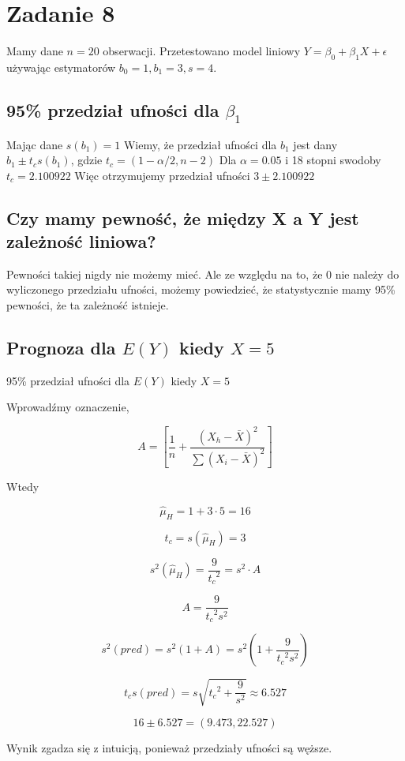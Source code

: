 \documentclass[9pt]{article}  %
\begin{document}
\section{Zadanie 8}


  Mamy dane $n = 20$ obserwacji. Przetestowano model liniowy
  $Y = \beta_0 + \beta_1X + \epsilon$ używając estymatorów
  $b_0 = 1, b_1 = 3, s = 4$.


  \subsection{95\% przedział ufności dla $\beta_1$}
  Mając dane $s(b_1) = 1$ Wiemy, że przedział ufności dla $b_1 $ jest dany \newline
  $b_1 \pm t_c s(b_1)$, gdzie $t_c = (1-\alpha/2, n-2)$ \newline
  Dla $\alpha = 0.05$ i 18 stopni swodoby $t_c = 2.100922$ \newline
  Więc otrzymujemy przedział ufności \newline
  $3 \pm 2.100922$
  
  
  
  \subsection{Czy mamy pewność, że między X a Y jest zależność liniowa?}
  
    Pewności takiej nigdy nie możemy mieć. Ale ze względu na to, że 0 nie należy do wyliczonego przedziału ufności, możemy powiedzieć, że statystycznie mamy 95\% pewności, że ta zależność istnieje.
  
  \subsection{Prognoza dla $E(Y)$ kiedy $X =5$}

  95\% przedział ufności dla $E(Y)$ kiedy $X =5$

  Wprowadźmy oznaczenie,

    $$ A= \left[  \frac{1}{n} + \frac{(X_h-\bar{X})^2 }{\sum{(X_i-\bar{X})^2} }   \right] $$
    
    Wtedy
    
    $$ \hat{\mu}_H = 1+3 \cdot 5 = 16 $$
    
    $$t_c = s(\hat{\mu}_H) = 3$$
    
    $$ s^2(\hat{\mu}_H) = \frac{9}{{t_c}^2} = s^2 \cdot A$$
    
    $$A = \frac{9}{{t_c}^2 s^2}$$
    
    $$s^2(pred) = s^2(1+A) = s^2 \left(1+ \frac{9}{{t_c}^2 s^2} \right)$$
    
    $$t_c s(pred) = s \sqrt{{t_c}^2 +  \frac{9}{s^2}}  \approx 6.527 $$
    
    $$ 16\pm 6.527  = (9.473, 22.527)$$
    
    Wynik zgadza się z intuicją, ponieważ przedziały ufności są węższe.


    


    
    
\end{document}
